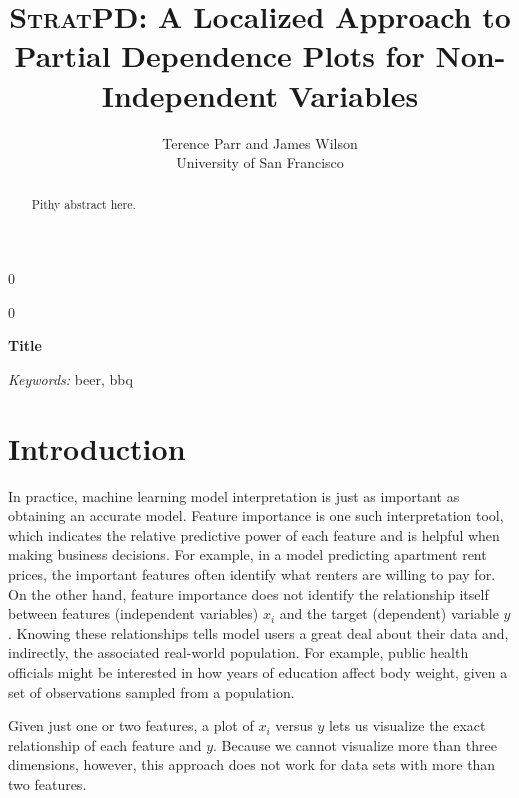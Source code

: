 \documentclass[12pt]{article}
\newcommand{\blind}{0}
\newcommand{\spd}{\fontfamily{cmr}\textsc{\textbf{StratPD}}}
\begin{document}
\def\spacingset#1{\renewcommand{\baselinestretch}%
{#1}\small\normalsize} \spacingset{1}



\blind
{
  \title{\bf \spd: A Localized Approach to Partial Dependence Plots for Non-Independent Variables}

  \author{Terence Parr and James Wilson\\
      University of San Francisco\\
}
  \maketitle
} \fi

\blind
{
  \bigskip
  \bigskip
  \bigskip
  \begin{center}
    {\LARGE\bf Title}
\end{center}
  \medskip
} \fi

\bigskip
\begin{abstract}
Pithy abstract here.
\end{abstract}

\noindent%
{\it Keywords:} beer, bbq

\section{Introduction}
\label{sec:intro}

In practice, machine learning model interpretation is just as important as obtaining an accurate model. Feature importance is one such interpretation tool, which indicates the relative predictive power of each feature and is helpful when making business decisions. For example, in a model predicting apartment rent prices, the important features often identify what renters are willing to pay for. On the other hand, feature importance does not identify the relationship itself between features (independent variables) $x_i$ and the target (dependent) variable $y$.  Knowing these relationships tells model users a great deal about their data and, indirectly, the associated real-world population. For example, public health officials might be interested in how years of education affect body weight, given a set of observations sampled from a population.

Given just one or two features, a plot of $x_i$ versus $y$ lets us visualize the exact relationship of each feature and $y$.  Because we cannot visualize more than three dimensions, however, this approach does not work for data sets with more than two features.
\end{document}
